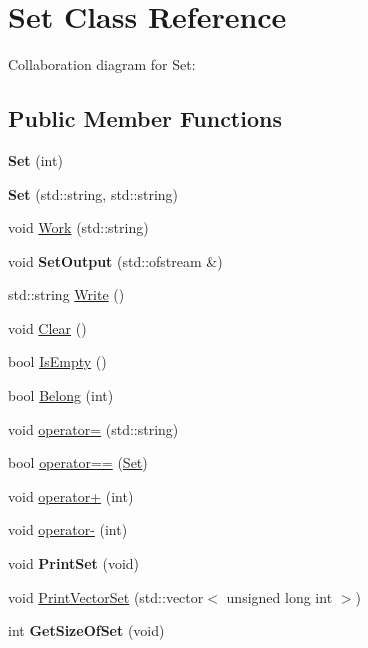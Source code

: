 \hypertarget{classSet}{}\section{Set Class Reference}
\label{classSet}


Collaboration diagram for Set\+:
\subsection*{Public Member Functions}
\begin{DoxyCompactItemize}
\item 
\mbox{\label{classSet_a545e44270dff7f873f7203aa5c6ca3a1}} 
{\bfseries Set} (int)
\item 
\mbox{\label{classSet_a9387dcd9189f0b036d731cf4f169de05}} 
{\bfseries Set} (std\+::string, std\+::string)
\item 
void \hyperlink{classSet_aa25ad5b9d72e4d428eb564b2eb208e3b}{Work} (std\+::string)
\item 
\mbox{\label{classSet_acc57a5a86498c7efb365b4dfbf1fd247}} 
void {\bfseries Set\+Output} (std\+::ofstream \&)
\item 
std\+::string \hyperlink{classSet_afc0f35a8d6903b892bb283813511fea9}{Write} ()
\item 
void \hyperlink{classSet_abe5c5439f3665baba2da0b1f1a4c03fd}{Clear} ()
\item 
bool \hyperlink{classSet_a0361a3a2b7a408514a259b326245cbc7}{Is\+Empty} ()
\item 
bool \hyperlink{classSet_a8fb9899afe9a09628706cf539cc75a1c}{Belong} (int)
\item 
void \hyperlink{classSet_a7f28cadb13f4cc86a87f64b9f885877a}{operator=} (std\+::string)
\item 
bool \hyperlink{classSet_a3087ba7a27e33fbb1b2a091c405ba046}{operator==} (\hyperlink{classSet}{Set})
\item 
void \hyperlink{classSet_a33786bba5f634c5023d047b5f1f1a292}{operator+} (int)
\item 
void \hyperlink{classSet_a1e58afdc9befac1dbe295a0bdccfeacb}{operator-\/} (int)
\item 
\mbox{\label{classSet_a1440c7bdad66b1864b41b4aafb188245}} 
void {\bfseries Print\+Set} (void)
\item 
void \hyperlink{classSet_a167b6d87b1698a61f269835c34c455cc}{Print\+Vector\+Set} (std\+::vector$<$ unsigned long int $>$)
\item 
\mbox{\label{classSet_a6c55977d6e5c48ab791bbe49e832c5ba}} 
int {\bfseries Get\+Size\+Of\+Set} (void)
\end{DoxyCompactItemize}
